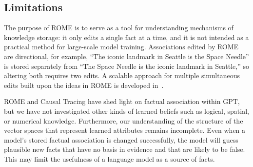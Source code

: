 \subsection{Limitations}

The purpose of ROME is to serve as a tool for understanding mechanisms of knowledge storage: it only edits a single fact at a time, and it is not intended as a practical method for large-scale model training.  Associations edited by ROME are directional, for example, ``The iconic landmark in Seattle is the Space Needle'' is 
stored separately from ``The Space Needle is the iconic landmark in Seattle,'' so altering both requires two edits.  A scalable approach for multiple simultaneous edits built upon the ideas in ROME is developed in~\citet*{meng2022memit}.

ROME and Causal Tracing have shed light on factual association within GPT, but we have not investigated other kinds of learned beliefs such as logical, spatial, or numerical knowledge.  Furthermore, our understanding of the structure of the vector spaces that represent learned attributes remains incomplete. Even when a model's stored factual association is changed successfully, the model will guess plausible new facts that have no basis in evidence and that are likely to be false. This may limit the usefulness of a language model as a source of facts.



